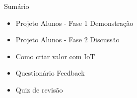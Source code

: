 
\begin{frame}{Sumário}
    \begin{itemize}
        \item Projeto Alunos - Fase 1 Demonstração
        \item Projeto Alunos - Fase 2 Discussão
        \item Como criar valor com IoT
        \item Questionário Feedback
        \item Quiz de revisão
    \end{itemize}
\end{frame}